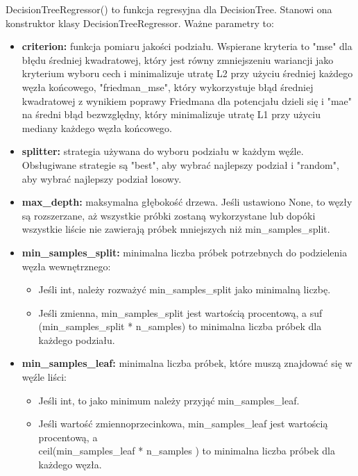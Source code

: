 \documentclass[10pt,a4paper]{article}
\begin{document}
DecisionTreeRegressor() to funkcja regresyjna dla DecisionTree. Stanowi ona konstruktor klasy DecisionTreeRegressor. Ważne parametry to:
\begin{itemize}
	\item \textbf{criterion:} funkcja pomiaru jakości podziału. Wspierane kryteria to "mse" dla błędu średniej kwadratowej, który jest równy zmniejszeniu wariancji jako kryterium wyboru cech i minimalizuje utratę L2 przy użyciu średniej każdego węzła końcowego, "friedman\_mse", który wykorzystuje błąd średniej kwadratowej z wynikiem poprawy Friedmana dla potencjału dzieli się i "mae" na średni błąd bezwzględny, który minimalizuje utratę L1 przy użyciu mediany każdego węzła końcowego.
	\item \textbf{splitter:} strategia używana do wyboru podziału w każdym węźle. Obsługiwane strategie są "best", aby wybrać najlepszy podział i "random", aby wybrać najlepszy podział losowy.
	\item \textbf{max\_depth:} maksymalna głębokość drzewa. Jeśli ustawiono None, to węzły są rozszerzane, aż wszystkie próbki zostaną wykorzystane lub dopóki wszystkie liście nie zawierają próbek mniejszych niż min\_samples\_split.
	\item \textbf{min\_samples\_split:} minimalna liczba próbek potrzebnych do podzielenia węzła wewnętrznego:
	\begin{itemize}
		\item Jeśli int, należy rozważyć min\_samples\_split jako minimalną liczbę.
		\item Jeśli zmienna, min\_samples\_split jest wartością procentową, a suf (min\_samples\_split * n\_samples) to minimalna liczba próbek dla każdego podziału.
	\end{itemize}

	\item \textbf{min\_samples\_leaf:} minimalna liczba próbek, które muszą znajdować się w węźle liści:
	\begin{itemize}
		\item Jeśli int, to jako minimum należy przyjąć min\_samples\_leaf.
		\item Jeśli wartość zmiennoprzecinkowa, min\_samples\_leaf jest wartością procentową, a \\ceil(min\_samples\_leaf * n\_samples ) to minimalna liczba próbek dla każdego węzła.
	\end{itemize}


\end{itemize}
\end{document}
